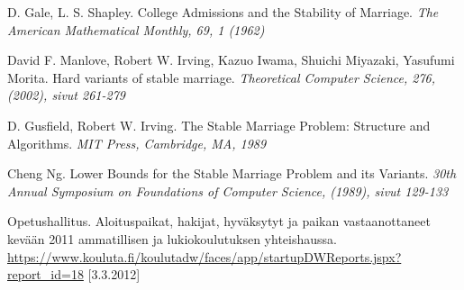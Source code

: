 \documentclass[gradu, twoside]{tktltiki}
\begin{document}
\begin{thebibliography}{XXX99}

  D. Gale, L. S. Shapley.
  College Admissions and the Stability of Marriage.
  \emph{The American Mathematical Monthly, 69, 1 (1962)}

  David F. Manlove, Robert W. Irving, Kazuo Iwama, Shuichi Miyazaki,
  Yasufumi Morita.
  Hard variants of stable marriage.
  \emph{Theoretical Computer Science, 276, (2002), sivut 261-279}

  D. Gusfield, Robert W. Irving.
  The Stable Marriage Problem: Structure and Algorithms.
  \emph{MIT Press, Cambridge, MA, 1989}

  Cheng Ng.
  Lower Bounds for the Stable Marriage Problem and its Variants.
  \emph{30th Annual Symposium on Foundations of Computer Science,
    (1989), sivut 129-133}

  Opetushallitus.
  Aloituspaikat, hakijat, hyväksytyt ja paikan vastaanottaneet kevään
  2011 ammatillisen ja lukiokoulutuksen yhteishaussa.
  \url{https://www.kouluta.fi/koulutadw/faces/app/startupDWReports.jspx?report_id=18}
      [3.3.2012]

\end{thebibliography}
\end{document}
